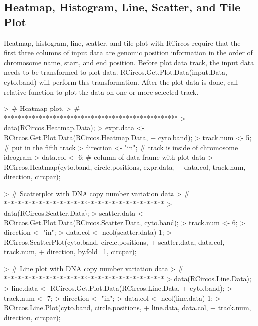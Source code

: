 \documentclass{article}
\begin{document}
\subsection{Heatmap, Histogram, Line, Scatter, and Tile Plot}

Heatmap, histogram, line, scatter, and tile plot with RCircos require that the first three columns of input data are genomic position information in the order of chromosome name, start, and end position. Before plot data track, the input data needs to be transformed to plot data. RCircos.Get.Plot.Data(input.Data, cyto.band) will perform this transformation. After the plot data is done, call relative function to plot the data on one or more selected track.

\begin{Schunk}
\begin{Sinput}
> #	Heatmap plot. 
> #	**************************************************
> data(RCircos.Heatmap.Data);
> expr.data <- RCircos.Get.Plot.Data(RCircos.Heatmap.Data, 
+ 				cyto.band);
> track.num <- 5;     # put in the fifth track
> direction <- "in";  # track is inside of chromosome ideogram
> data.col <- 6;      # column of data frame with plot data
> RCircos.Heatmap(cyto.band, circle.positions, expr.data, 
+ 			data.col, track.num, direction, circpar);
\end{Sinput}
\end{Schunk}

\begin{Schunk}
\begin{Sinput}
> #	Scatterplot with DNA copy number variation data
> #	**********************************************
> data(RCircos.Scatter.Data);
> scatter.data <- RCircos.Get.Plot.Data(RCircos.Scatter.Data, 				cyto.band);
> track.num <- 6; 
> direction <- "in";
> data.col <- ncol(scatter.data)-1;
> RCircos.ScatterPlot(cyto.band, circle.positions, 
+ 		scatter.data, data.col, track.num,  
+ 		direction, by.fold=1, circpar);
\end{Sinput}
\end{Schunk}

\begin{Schunk}
\begin{Sinput}
> #	Line plot with DNA copy number variation data
> #	**********************************************
> data(RCircos.Line.Data);
> line.data <- RCircos.Get.Plot.Data(RCircos.Line.Data, 
+ 		cyto.band);
> track.num <- 7;
> direction <- "in";
> data.col <- ncol(line.data)-1;
> RCircos.Line.Plot(cyto.band, circle.positions, 
+ 			line.data, data.col, 
+ 			track.num, direction, circpar);
\end{Sinput}
\end{Schunk}
\end{document}
